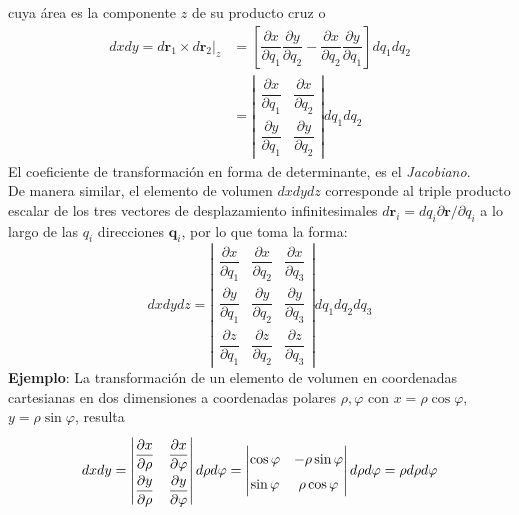 cuya área es la componente $z$ de su producto cruz o
\[ \renewcommand\arraystretch{2} \begin{split}
dx dy = d\mathbf{r}_{1} \times d \mathbf{r}_{2}\big\vert_{z} &= \left[ \dfrac{\partial x}{\partial q_{1}} \dfrac{\partial y}{\partial q_{2}} - \dfrac{\partial x}{\partial q_{2}} \dfrac{\partial y}{\partial q_{1}} \right] dq_{1} dq_{2} \\
&= \left| \begin{matrix}
\dfrac{\partial x}{\partial q_{1}} & \dfrac{\partial x}{\partial q_{2}} \\
\dfrac{\partial y}{\partial q_{1}} & \dfrac{\partial y}{\partial q_{2}}
\end{matrix} \right| dq_{1} dq_{2}
\end{split} \]
El coeficiente de transformación en forma de determinante, es el \emph{Jacobiano}.
\\
De manera similar, el elemento de volumen $dxdydz$ corresponde al triple producto escalar de los tres vectores de desplazamiento infinitesimales $d\mathbf{r}_{i} =  d q_{i} \partial \mathbf{r} / \partial q_{i}$ a lo largo de las $q_{i}$ direcciones $\mathbf{\widehat{q}}_{i}$, por lo que toma la forma:
\[ \renewcommand\arraystretch{2} dx dy dz = \left| \begin{matrix}
\dfrac{\partial x}{\partial q_{1}} & \dfrac{\partial x}{\partial q_{2}} & \dfrac{\partial x}{\partial q_{3}} \\
\dfrac{\partial y}{\partial q_{1}} & \dfrac{\partial y}{\partial q_{2}} & \dfrac{\partial y}{\partial q_{3}} \\
\dfrac{\partial z}{\partial q_{1}} & \dfrac{\partial z}{\partial q_{2}} & \dfrac{\partial z}{\partial q_{3}}
\end{matrix} \right| dq_{1} dq_{2} dq_{3} \]
\textbf{Ejemplo}: La transformación de un elemento de volumen en coordenadas cartesianas en dos dimensiones a coordenadas polares $\rho, \varphi$ con $x= \rho \cos \varphi$, $y= \rho \sin \varphi$, resulta
\[\renewcommand\arraystretch{2} dx dy = \left| \begin{matrix}
\dfrac{\partial x }{\partial \rho} & \dfrac{\partial x}{\partial \varphi} \\
\dfrac{\partial y }{\partial \rho} & \dfrac{\partial y}{\partial \varphi} 
\end{matrix} \right| d \rho d \varphi  =
\left| \renewcommand\arraystretch{1.5} \begin{matrix}
\cos \varphi & - \rho \sin \varphi \\
\sin \varphi & \rho \cos \varphi 
\end{matrix}  \right| d \rho d \varphi =  \rho d \rho d \varphi \]

